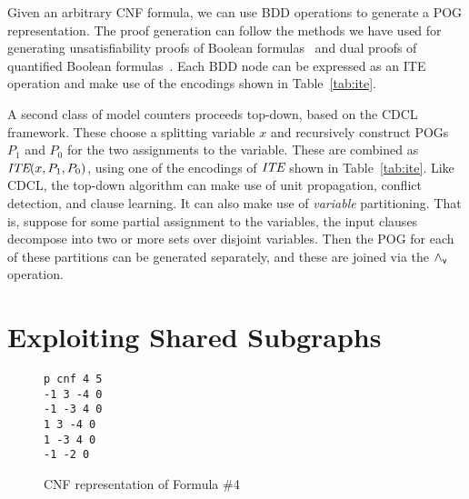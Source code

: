 \documentclass{llncs}
\newcommand{\pand}{\mathbin{\land_{\sf v}}}
\newcommand{\obar}[1]{\overline{#1}}
\newcommand{\ite}{\mbox{\it ITE}}
\begin{document}
Given an arbitrary CNF formula, we can use BDD operations to generate
a POG representation.  The proof generation can follow the
methods we have used for generating unsatisfiability proofs of Boolean
formulas~\cite{bryant:tacas:2021} and dual proofs of quantified
Boolean formulas~\cite{bryant:cade:2021}.
Each BDD node can be expressed as an ITE operation and
make use of the encodings shown in Table~\ref{tab:ite}.

A second class of model counters proceeds top-down, based on the CDCL
framework.  These choose a splitting variable $x$ and recursively
construct POGs $P_1$ and $P_0$ for the two assignments to the
variable.  These are combined as $\ite(x, P_1, P_0)$, using one of the
encodings of $\ite$ shown in Table~\ref{tab:ite}.  Like CDCL, the
top-down algorithm can make use of unit propagation, conflict
detection, and clause learning.  It can also make use of {\em
  variable} partitioning.  That is, suppose for some partial
assignment to the variables, the input clauses decompose into two or
more sets over disjoint variables.  Then the POG for each of these
partitions can be generated separately, and these are joined via the $\pand$
operation.



\section{Exploiting Shared Subgraphs}

\begin{figure}
\begin{verbatim}
p cnf 4 5
-1 3 -4 0
-1 -3 4 0
1 3 -4 0
1 -3 4 0
-1 -2 0
\end{verbatim}
\caption{CNF representation of Formula \#4}
\label{fig:eg4:cnf}
\end{figure}
\end{document}
